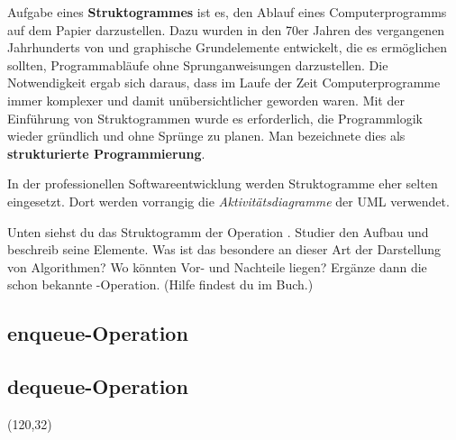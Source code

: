 \documentclass[10pt, a4paper]{arbeitsblatt}
\begin{document}
\ReiheTitel

\begin{infobox}
	Aufgabe eines \textbf{Struktogrammes} ist es, den Ablauf eines Computerprogramms
	auf dem Papier darzustellen. Dazu wurden in den 70er Jahren des vergangenen
	Jahrhunderts von  und  graphische
	Grundelemente entwickelt, die es ermöglichen sollten, Programmabläufe ohne
	Sprunganweisungen darzustellen. Die Notwendigkeit ergab sich daraus, dass im
	Laufe der Zeit Computerprogramme immer komplexer und damit unübersichtlicher
	geworden waren. Mit der Einführung von Struktogrammen wurde es erforderlich,
	die Programmlogik wieder gründlich und ohne Sprünge zu planen. Man bezeichnete
	dies als \textbf{strukturierte Programmierung}.

	In der professionellen Softwareentwicklung werden Struktogramme eher selten
	eingesetzt. Dort werden vorrangig die \emph{Aktivitätsdiagramme} der UML verwendet.
\end{infobox}

\begin{aufgabe}[subtitle=Operationen der Schlange]
Unten siehst du das Struktogramm der Operation
. Studier den Aufbau und beschreib seine Elemente. Was ist
das besondere an dieser Art der Darstellung von Algorithmen? Wo könnten Vor-
und Nachteile liegen? Ergänze dann die schon bekannte
-Operation. (Hilfe findest du im Buch.)
\end{aufgabe}

\subsection*{enqueue-Operation}
\begin{rahmen}
	\vspace{5cm}
\end{rahmen}

\subsection*{dequeue-Operation}

\begin{center}
	\ttfamily\small
	\begin{struktogramm}(120,32)
	\change
		\change
		\ifend
	\ifend
	\end{struktogramm}
\end{center}
\end{document}
